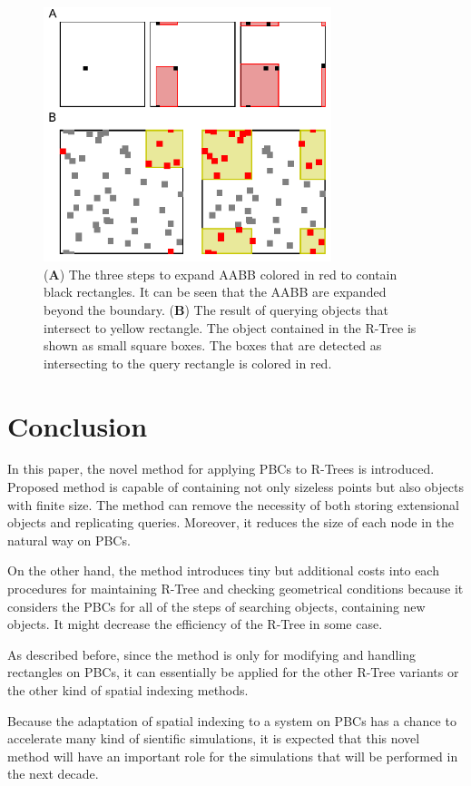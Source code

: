 \documentclass[10pt,letterpaper,twocolumn]{article}
\begin{document}
\begin{figure}[htb]
    \includegraphics[width=8.4cm, bb=4 6 237 212]{fig-result-expand-intersect.eps}
    \caption{
    (\textbf{A})
    The three steps to expand AABB colored in red to contain black rectangles.
    It can be seen that the AABB are expanded beyond the boundary.
    (\textbf{B})
    The result of querying objects that intersect to yellow rectangle.
    The object contained in the R-Tree is shown as small square boxes.
    The boxes that are detected as intersecting to the query rectangle is
    colored in red.
    }
    \label{fig-result}
\end{figure}

\section*{Conclusion}

In this paper, the novel method for applying PBCs to R-Trees is introduced.
Proposed method is capable of containing not only sizeless points but also
objects with finite size. The method can remove the necessity of both storing
extensional objects and replicating queries. Moreover, it reduces the
size of each node in the natural way on PBCs.

On the other hand, the method introduces tiny but additional costs into each
procedures for maintaining R-Tree and checking geometrical conditions because it
considers the PBCs for all of the steps of searching objects, containing new
objects. It might decrease the efficiency of the R-Tree in some case.

As described before, since the method is only for modifying and handling
rectangles on PBCs, it can essentially be applied for the other R-Tree variants
or the other kind of spatial indexing methods.

Because the adaptation of spatial indexing to a system on PBCs has a chance to
accelerate many kind of sientific simulations, it is expected that this novel
method will have an important role for the simulations that will be performed in
the next decade.


{}
\end{document}
